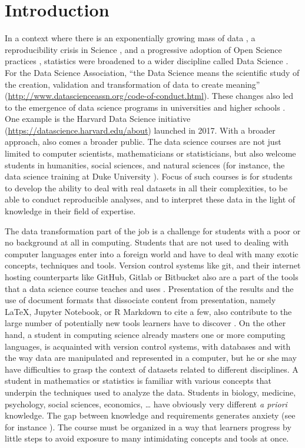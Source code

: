 \documentclass{aims}
\theoremstyle{definition}
\begin{document}
\hypertarget{introduction}{%
\section{Introduction}\label{introduction}}

In a context where there is an exponentially growing mass of data
\cite{Marx2013}, a reproducibility crisis in Science \cite{Baker2016},
and a progressive adoption of Open Science practices \cite{Banks2019},
statistics were broadened to a wider discipline called Data Science
\cite{Cleveland2001}. For the Data Science Association, ``the Data
Science means the scientific study of the creation, validation and
transformation of data to create meaning''
(\url{http://www.datascienceassn.org/code-of-conduct.html}). These
changes also led to the emergence of data science programs in
universities and higher schools \cite{Donoho2017, Cetinkaya-Rundel2021}.
One example is the Harvard Data Science initiative
(\url{https://datascience.harvard.edu/about}) launched in 2017. With a
broader approach, also comes a broader public. The data science courses
are not just limited to computer scientists, mathematicians or
statisticians, but also welcome students in humanities, social sciences,
and natural sciences (for instance, the data science training at Duke
University \cite{Cetinkaya-Rundel2021}). Focus of such courses is for
students to develop the ability to deal with real datasets in all their
complexities, to be able to conduct reproducible analyses, and to
interpret these data in the light of knowledge in their field of
expertise.

The data transformation part of the job is a challenge for students with
a poor or no background at all in computing. Students that are not used
to dealing with computer languages enter into a foreign world and have
to deal with many exotic concepts, techniques and tools. Version control
systems like git, and their internet hosting counterparts like GitHub,
Gitlab or Bitbucket also are a part of the tools that a data science
course teaches and uses \cite{Fiksel2019, Hsing2019}. Presentation of
the results and the use of document formats that dissociate content from
presentation, namely LaTeX, Jupyter Notebook, or R Markdown to cite a
few, also contribute to the large number of potentially new tools
learners have to discover \cite{Baumer2014}. On the other hand, a
student in computing science already masters one or more computing
languages, is acquainted with version control systems, with databases
and with the way data are manipulated and represented in a computer, but
he or she may have difficulties to grasp the context of datasets related
to different disciplines. A student in mathematics or statistics is
familiar with various concepts that underpin the techniques used to
analyze the data. Students in biology, medicine, psychology, social
sciences, economics, \ldots{} have obviously very different \emph{a
priori} knowledge. The gap between knowledge and requirements generates
anxiety (see for instance \cite{Onwuegbuzie2003}). The course must be
organized in a way that learners progress by little steps to avoid
exposure to many intimidating concepts and tools at once.
\end{document}
